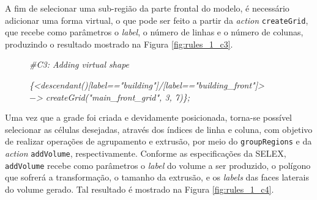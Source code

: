 \newpage

A fim de selecionar uma sub-região da parte frontal do modelo, é necessário adicionar uma forma virtual, o que pode ser feito a partir da \textit{action} \texttt{createGrid}, que recebe como parâmetros o \textit{label}, o número de linhas e o número de colunas, produzindo o resultado mostrado na Figura \ref{fig:rules_1_c3}.

\vspace{0.3cm}

\begin{description}
    \item[] \qquad \textit{\#C3: Adding virtual shape}
    \item[] \qquad \textit{\{<descendant()[label=="building"]/[label=="building\_front"]>} \\
    \textit{$-$> createGrid("main\_front\_grid", 3, 7)\};}
\end{description}

\vspace{0.3cm}

\begin{figure}[h!]
	\centering
	\captionsetup{width=15cm}
	{}	
\end{figure}

Uma vez que a grade foi criada e devidamente posicionada, torna-se possível selecionar as células desejadas, através dos índices de linha e coluna, com objetivo de realizar operações de agrupamento e extrusão, por meio do \texttt{groupRegions} e da \textit{action} \texttt{addVolume}, respectivamente. Conforme as especificações da \gls{SELEX}, \texttt{addVolume} recebe como parâmetros o \textit{label} do volume a ser produzido, o polígono que sofrerá a transformação, o tamanho da extrusão, e os \textit{labels} das faces laterais do volume gerado. Tal resultado é mostrado na Figura \ref{fig:rules_1_c4}.

